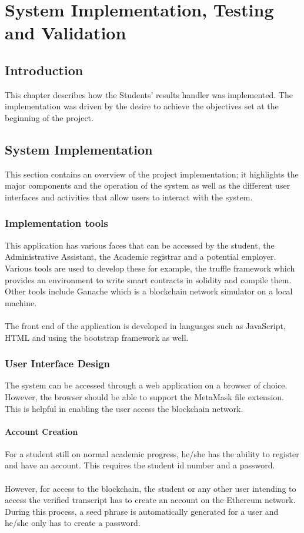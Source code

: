 \chapter{System Implementation, Testing and Validation}
\section{Introduction}
This chapter describes how the Students’ results handler was implemented. The implementation was driven by the desire to achieve the objectives set at the beginning of the project.

\section{System Implementation}
This section contains an overview of the project implementation; it highlights the major components and the operation of the system as well as the different user interfaces and activities that allow users to interact with the system.

\subsection{Implementation tools}
This application has various faces that can be accessed by the student, the Administrative Assistant, the Academic registrar and a potential employer. Various tools are used to develop these for example, the truffle framework which provides an environment to write smart contracts in solidity and compile them. Other tools include Ganache which is a blockchain network simulator on a local machine.\\~\\
The front end of the application is developed in languages such as JavaScript, HTML and using the bootstrap framework as well.

\subsection{User Interface Design}
The system can be accessed through a web application on a browser of choice. However, the browser should be able to support the MetaMask file extension. This is helpful in enabling the user access the blockchain network.

\subsubsection{Account Creation}
For a student still on normal academic progress, he/she has the ability to register and have an account. This requires the student id number and a password. \\~\\
However, for access to the blockchain, the student or any other user intending to access the verified transcript has to create an account on the Ethereum network. During this process, a seed phrase is automatically generated for a user and he/she only has to create a password.

